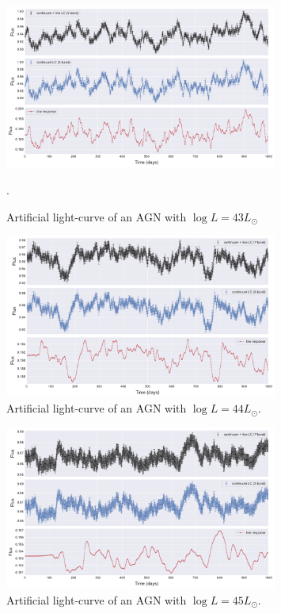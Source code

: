 \documentclass[letterpaper, oneside]{article}
\begin{document}
\begin{figure}[h]
	\centering
	\includegraphics[width=0.8\textwidth]{../art_lcs_logL43.pdf}
	\caption{Artificial light-curve of an AGN with $\log L = 43 L_{\odot}$}.
	\label{fig:art_lcs_L43}
\end{figure}

\begin{figure}[p]
	\centering
	\includegraphics[width=0.8\textwidth]{../art_lcs_logL44.pdf}
	\caption{Artificial light-curve of an AGN with $\log L = 44 L_{\odot}$.}
	\label{fig:art_lcs_L44}
\end{figure}

\begin{figure}[p]
	\centering
	\includegraphics[width=0.8\textwidth]{../art_lcs_logL45.pdf}
	\caption{Artificial light-curve of an AGN with $\log L = 45 L_{\odot}$.}
	\label{fig:art_lcs_L45}
\end{figure}
\end{document}
